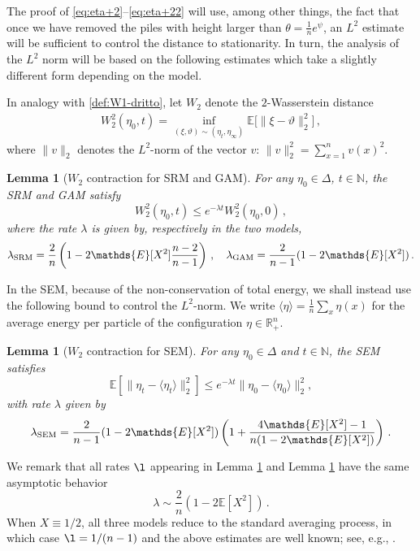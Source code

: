 \documentclass[11pt,reqno]{amsart}
\newtheorem{lemma}[theorem]{Lemma}
\theoremstyle{remark}
\theoremstyle{definition}
\numberwithin{equation}{section}
\numberwithin{figure}{section}
\newcommand{\E}{\mathds{E}}
\newcommand{\R}{\mathbb{R}}
\newcommand{\N}{\mathbb{N}}
\newcommand{\tonde}[1]{\left(#1\right)}
\let\D=\Delta \let\F=\Phi  \let\G=\Gamma  \let\L=\Lambda \let\The=\Theta
\begin{document}
The proof of \eqref{eq:eta+2}--\eqref{eq:eta+22} will use, among other things,  the fact that once we have removed the piles with height larger than $\theta=\frac1ne^\psi$, an $L^2$ estimate will be sufficient to control the distance to stationarity. In turn, the analysis of the $L^2$ norm will be based on the following estimates which take a slightly different form depending on the model. 



In analogy with \eqref{def:W1-dritto}, let $W_2$ denote the $2$-Wasserstein distance
\begin{align}\label{def:W2-dritto}
	W^2_2(\eta_0,t)	
	= \inf_{(\xi,\vartheta)\sim(\eta_t,\eta_{\infty})}\E\big[\|\xi-\vartheta\|^2_2\big]\,,
\end{align}
where $\|v\|_2$ denotes the $L^2$-norm of the vector $v$:  $\|v\|^2_2=\sum_{x=1}^nv(x)^2$. 
\begin{lemma}[$W_2$ contraction for SRM and GAM]\label{lemma:AL}
For any $\eta_0\in \D$, $t\in\N$, the SRM and GAM satisfy
	\begin{equation}\label{eq:2contraction}
		W_2^2(\eta_0,t)\le 	e^{-\lambda t}W_2^2(\eta_0,0)\,,
	\end{equation}
	where the rate $\lambda$ is given by, respectively in the two models,
\begin{equation}\label{eq:2gap}
		\lambda_{\rm SRM} = 
		\frac2n \tonde{1-2\E[X^2]\frac{n-2}{n-1}}\,,\quad 
		\lambda_{\rm GAM} = \frac{2}{n-1}(1-2\E[X^2])\,.
	\end{equation}
	\end{lemma}
In the SEM, because of the non-conservation of total energy, we shall instead use the following bound to control the $L^2$-norm. 
We write $\langle \eta\rangle = \frac1n\sum_x \eta(x)$ for the average energy per particle of the configuration $\eta \in \R_+^n$. 
\begin{lemma}[$W_2$ contraction for SEM]\label{lemma:AL_HMP}
For any $\eta_0\in \D$ and $t\in\N$, the SEM satisfies
	\begin{equation}\label{eq:contraction-hpm}
	\E	\left[\|\eta_t-\langle \eta_t\rangle\|_2^2\right]\le 
		e^{-\lambda t} 	\|\eta_0-\langle \eta_0\rangle\|_2^2,
	\end{equation}
	with rate $\lambda$ given by
\begin{equation}\label{eq:2gaps}
		\lambda_{\rm SEM} = 
		\frac{2}{n-1}(1-2\E[X^2])\tonde{1+ \frac{4\E[X^2]-1}{n(1-2\E[X^2])}}\,.
	\end{equation}
	\end{lemma}
	We remark that all rates $\l$ appearing in Lemma \ref{lemma:AL} and Lemma \ref{lemma:AL_HMP} have the same asymptotic behavior
	 	\begin{equation}\label{eq:limit-gap}
		\lambda\sim \frac2n \left(1-2\E[X^2]\right)\,.
	\end{equation}
When $X\equiv1/2$, all three models reduce to the standard averaging process, in which case $\l=1/(n-1)$ and the above estimates are well known; see, e.g., \cite{aldous_lecture_2012,chatterjee2020phase}. 
\end{document}
